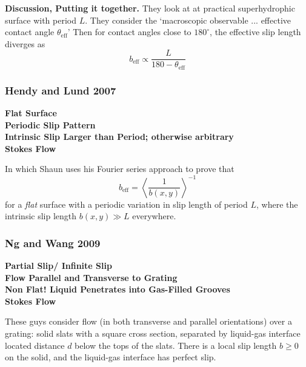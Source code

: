 \documentclass{article}
\newcommand{\beff}{\ensuremath{b_{\mathrm{eff}}}}
\begin{document}
\textbf{Discussion, Putting it together.}
They look at at practical superhydrophic surface with period $L$. They consider the `macroscopic observable ... effective contact angle $\theta_{\mathrm{eff}}$' Then for contact angles close to $180^{\circ}$, the effective slip length diverges as
\[ \beff \propto \frac{L}{180 - \theta_{\mathrm{eff}}} \]


\subsubsection*{Hendy and Lund 2007}
\textbf{Flat Surface \\ Periodic Slip Pattern \\ Intrinsic Slip Larger than Period; otherwise arbitrary \\ Stokes Flow}


In which Shaun uses his Fourier series approach to prove that
\[ \beff = \left< \frac{1}{b(x,y)} \right>^{-1} \]
for a \emph{flat} surface with a periodic variation in slip length of period $L$, where the intrinsic slip length $b(x,y) \gg L$ everywhere.


\subsubsection*{Ng and Wang 2009}
\textbf{Partial Slip/ Infinite Slip \\ Flow Parallel and Transverse to Grating \\ Non Flat! Liquid Penetrates into Gas-Filled Grooves \\ Stokes Flow}

These guys consider flow (in both transverse and parallel orientations) over a grating: solid slats with a square cross section, separated by liquid-gas interface located distance $d$ below the tops of the slats.  There is a local slip length $b \geq 0$ on the solid, and the liquid-gas interface has perfect slip.

\vspace*{1em}
\end{document}
